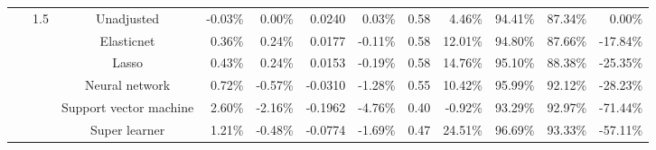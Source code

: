 \documentclass{article}
\begin{document}
\begin{center}
\begin{table}[!ht]
\begin{tabular*}{\textwidth}{@{\extracolsep\fill}c|c|c|rrrr|rrrrr}
        ~ & \multirow{7}{*}{1.5} & Unadjusted & -0.03\% & 0.00\% & 0.0240 & 0.03\% & 0.58 & 4.46\% & 94.41\% & 87.34\% & 0.00\% \\ 
        ~ & ~ & Elasticnet & 0.36\% & 0.24\% & 0.0177 & -0.11\% & 0.58 & 12.01\% & 94.80\% & 87.66\% & -17.84\% \\ 
        ~ & ~ & Lasso & 0.43\% & 0.24\% & 0.0153 & -0.19\% & 0.58 & 14.76\% & 95.10\% & 88.38\% & -25.35\% \\ 
        ~ & ~ & Neural network & 0.72\% & -0.57\% & -0.0310 & -1.28\% & 0.55 & 10.42\% & 95.99\% & 92.12\% & -28.23\% \\ 
        ~ & ~ & Support vector machine & 2.60\% & -2.16\% & -0.1962 & -4.76\% & 0.40 & -0.92\% & 93.29\% & 92.97\% & -71.44\% \\ 
        ~ & ~ & Super learner & 1.21\% & -0.48\% & -0.0774 & -1.69\% & 0.47 & 24.51\% & 96.69\% & 93.33\% & -57.11\% \\       \cline{2-12}
        

\end{tabular*}
\end{table}
\end{center}
\end{document}
